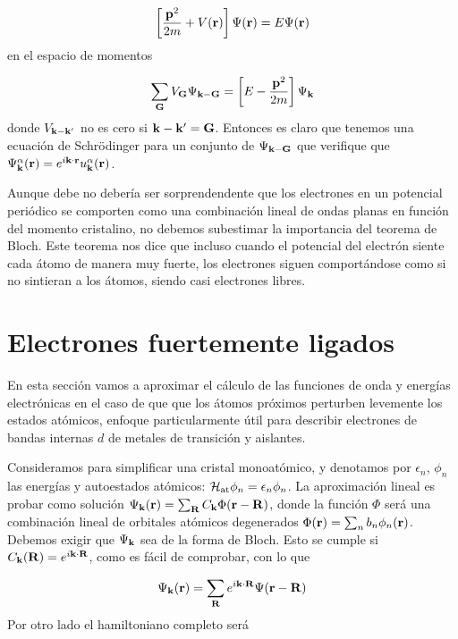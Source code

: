 \begin{equation}
	\left[ \frac{\mathbf{p}^2}{2m} + V(\mathbf{r}) \right] \Psi (\mathbf{r}) = E \Psi (\mathbf{r})
\end{equation}
en el espacio de momentos 


\begin{equation}
	\sum_{\mathbf{G}} V_{\mathbf{G}} \Psi_{\mathbf{k} - \mathbf{G}} =\left[ E-\frac{\mathbf{p}^2}{2m} \right]\Psi_{\mathbf{k} }
\end{equation}
donde $V_{\mathbf{k}-\mathbf{k}'}$ no es cero si $\mathbf{k}-\mathbf{k}'=\mathbf{G}$. Entonces es claro que tenemos una ecuación de Schrödinger para un conjunto de $\Psi_{\mathbf{k}-\mathbf{G}}$ que verifique que $\Psi_{\mathbf{k}}^\alpha (\mathbf{r}) = e^{i\mathbf{k} \cdot \mathbf{r}} u_{\mathbf{k}}^\alpha (\mathbf{r})$.

Aunque debe no debería ser sorprendendente que los electrones en un potencial periódico se comporten como una combinación lineal de ondas planas en función del momento cristalino, no debemos subestimar la importancia del teorema de Bloch. Este teorema nos dice que incluso cuando el potencial del electrón siente cada átomo de manera muy fuerte, los electrones siguen comportándose como si no sintieran a los átomos, siendo casi electrones libres. 



\section{Electrones fuertemente ligados}

En esta sección vamos a aproximar el cálculo de las funciones de onda y energías electrónicas en el caso de que que los átomos próximos perturben levemente los estados atómicos, enfoque particularmente útil para describir electrones de bandas internas $d$ de metales de transición y aislantes.  

Consideramos para simplificar una cristal monoatómico, y denotamos por $\epsilon_n$, $\phi_n$ las energías y autoestados atómicos: $\mathcal{H}_{\text{at}} \phi_n = \epsilon_n \phi_n$. La aproximación lineal es probar como solución $\Psi_{\mathbf{k}} (\mathbf{r}) = \sum_{\mathbf{R}} C_{\mathbf{k}} \Phi  (\mathbf{r} - \mathbf{R})$, donde la función $\Phi$ será una combinación lineal de orbitales atómicos degenerados $\Phi (\mathbf{r}) = \sum_n b_n \phi_n (\mathbf{r})$. Debemos exigir que $\Psi_{\mathbf{k}}$ sea de la forma de Bloch. Esto se cumple si $C_{\mathbf{k}} (\mathbf{R}) = e^{i \mathbf{k} \cdot \mathbf{R}}$, como es fácil de comprobar, con lo que 

\begin{equation}
	\Psi_{\mathbf{k}} (\mathbf{r}) = \sum_{\mathbf{R}} e^{i \mathbf{k} \cdot \mathbf{R}} \Psi (\mathbf{r} - \mathbf{R}) \label{Ec:07-05-01}
\end{equation} 
Por otro lado el hamiltoniano completo será 

